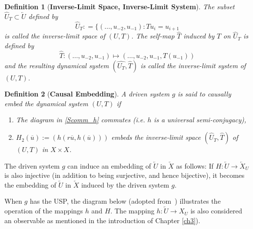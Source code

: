 \documentclass[a4paper,12pt,twoside]{report}
\newtheorem{Definition}{Definition}[]
\newtheorem{Theorem}{Theorem}[]
\begin{document}
\begin{Definition}
  [\bf Inverse-Limit Space, Inverse-Limit System]\label{Dfn_InverseL}\rm
 The subset $\widehat{U}_T\subset \overleftarrow{U}$ defined by \[\widehat{U}_T: = \{ (\ldots,u_{-2},u_{-1}): Tu_{i} = u_{i+1}\]is called the inverse-limit space of $(U,T)$.
 The self-map $\widehat{T}$  induced by $T$ on $\widehat{U}_T$  is defined by \[\widehat{T}: (\ldots,u_{-2},u_{-1}) \mapsto  (\ldots,u_{-2},u_{-1},T(u_{-1}))\] and the resulting dynamical system $(\widehat{U_T}, \widehat{T})$ is called the inverse-limit system of $(U,T)$.
\end{Definition}

\begin{Definition}
  [\bf Causal Embedding]\label{Dfn_CausalEmbed}\rm
  A driven system $g$ is said to causally embed the dynamical system $(U,T)$ if 
  \vspace{-8mm}
\begin{enumerate}[noitemsep, label=\roman*.]
  \item The diagram in \ref{Scomm_h} commutes (i.e. $h$ is a universal semi-conjugacy),
  \item $H_2(\overline{u}):=(h(r\overline{u}, h(\overline{u})))$ embeds the inverse-limit space $(\widehat{U}_T, \hat{T})$ of $(U,T)$ in $X\times{X}$.
\end{enumerate}
\end{Definition}

The driven system $g$ can induce an embedding of $\overleftarrow{U}$ in $\overleftarrow{X}$ as follows: 
If $H:\overleftarrow{U}{\to}{\overleftarrow{X}_U}$ is also injective (in addition to being surjective, and hence bijective), 
it becomes the embedding of $\overleftarrow{U}$ in $\overleftarrow{X}$ induced by the driven system $g$. %


When $g$ has the USP, the diagram below (adopted from~\cite{Manju_Nonlinearity}) illustrates the operation of the mappings $h$ and $H$. The mapping $h:\overleftarrow{U}\to{X_U}$ is also considered an observable as mentioned in the introduction of Chapter \ref{ch3}).  
\end{document}
